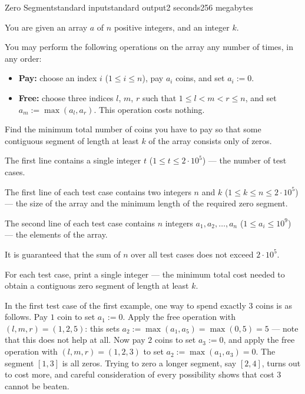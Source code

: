 \begin{problem}{Zero Segment}{standard input}{standard output}{2 seconds}{256 megabytes}

You are given an array $a$ of $n$ positive integers, and an integer $k$.

You may perform the following operations on the array any number of times, in any order:

\begin{itemize}
  \item \textbf{Pay:} choose an index $i$ ($1 \le i \le n$), pay $a_i$ coins, and set $a_i := 0$.
  \item \textbf{Free:} choose three indices $l$, $m$, $r$ such that $1 \le l < m < r \le n$, and set $a_m := \max(a_l, a_r)$. This operation costs nothing.
\end{itemize}

Find the minimum total number of coins you have to pay so that some contiguous segment of length at least $k$ of the array consists only of zeros.


\InputFile
The first line contains a single integer $t$ ($1 \le t \le 2 \cdot 10^5$) --- the number of test cases.

The first line of each test case contains two integers $n$ and $k$ ($1 \le k \le n \le 2 \cdot 10^5$) --- the size of the array and the minimum length of the required zero segment.

The second line of each test case contains $n$ integers $a_1, a_2, \ldots, a_n$ ($1 \le a_i \le 10^9$) --- the elements of the array.

It is guaranteed that the sum of $n$ over all test cases does not exceed $2 \cdot 10^5$.


\OutputFile
For each test case, print a single integer --- the minimum total cost needed to obtain a contiguous zero segment of length at least $k$.


\Examples

\begin{example}
%
%
\end{example}

\Note
In the first test case of the first example, one way to spend exactly $3$ coins is as follows. Pay $1$ coin to set $a_1 := 0$. Apply the free operation with $(l, m, r) = (1, 2, 5)$: this sets $a_2 := \max(a_1, a_5) = \max(0, 5) = 5$ --- note that this does not help at all. Now pay $2$ coins to set $a_3 := 0$, and apply the free operation with $(l, m, r) = (1, 2, 3)$ to set $a_2 := \max(a_1, a_3) = 0$. The segment $[1, 3]$ is all zeros. Trying to zero a longer segment, say $[2, 4]$, turns out to cost more, and careful consideration of every possibility shows that cost $3$ cannot be beaten.


\end{problem}
